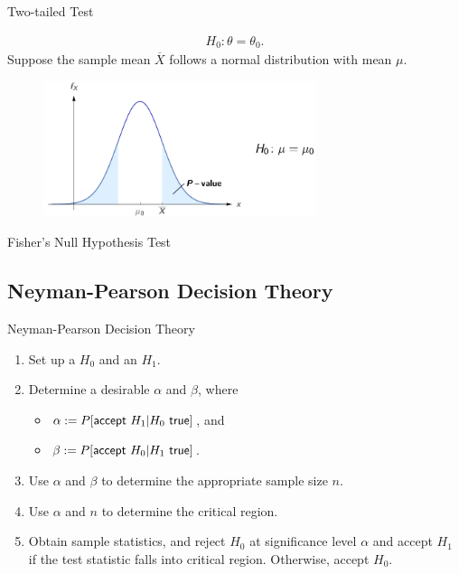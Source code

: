 \begin{frame}{Two-tailed Test}

\justifying
{}
\begin{align*}
H_0: \theta = \theta_0.
\end{align*}
 Suppose the sample mean $\overline{X}$ follows a normal distribution with mean $\mu$.
\begin{figure}[htbp]
	\centering
	\includegraphics[width=8cm]{./images/rc5fig2.png}
\end{figure}

\end{frame}

\begin{frame}{Fisher's Null Hypothesis Test}


\end{frame}


\subsection{Neyman-Pearson Decision Theory}

\begin{frame}{Neyman-Pearson Decision Theory}

\begin{enumerate}
	\justifying
	\item Set up a  $H_0$ and an  $H_1$.
	\item Determine a desirable $\alpha$ and $\beta$, where
	\begin{itemize}
		\item $\alpha := P[\U{accept\ } H_1|H_0 \U{\ true}]$, and
		\item $\beta := P[\U{accept\ } H_0|H_1 \U{\ true}]$.
	\end{itemize}
	\item Use $\alpha$ and $\beta$ to determine the appropriate sample size $n$. \highlightr{$\Delta$}
	\item Use $\alpha$ and $n$ to determine the critical region. \highlightr{$\Delta$}
	\item Obtain sample statistics, and reject $H_0$ at significance level $\alpha$ and accept $H_1$ if the test statistic falls into critical region. Otherwise, accept $H_0$.
\end{enumerate}

\end{frame}

